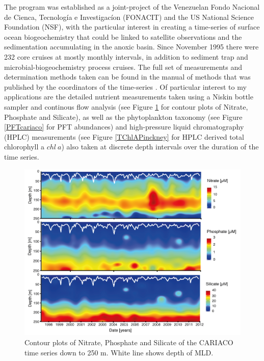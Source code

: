 The program was established as a joint-project of the Venezuelan Fondo Nacional de Cienca, Tecnolog\'{i}a e Investigac\'{i}on (FONACIT) and the US National Science Foundation (NSF), with the particular interest in creating a time-series of surface ocean biogeochemistry that could be linked to satellite observations and the sedimentation accumulating in the anoxic basin. 
Since  November 1995 there were 232 core cruises at mostly monthly intervals, in addition to sediment trap and microbial-biogeochemistry process cruises. The full set of measurements and determination methods taken can be found in the manual of methods that was published by the coordinators of the time-series \citep{Astor2013}. 
Of particular interest to my applications are the detailed nutrient measurements 
taken using a Niskin bottle sampler and continous flow analysis (see Figure \ref{CARIACOnuts} for contour plots of Nitrate, Phosphate and Silicate), as well as the phytoplankton taxonomy (see Figure \ref{PFTcariaco} for PFT abundances) and high-pressure liquid chromatography (HPLC) measurements (see Figure \ref{TChlAPinckney} for HPLC derived total chlorophyll a $chl~a$) also taken at discrete depth intervals over the duration of the time series. 

\begin{figure}
\centering
\includegraphics[trim = 0mm 0mm 0mm 0mm, clip, width=1.\linewidth]{./Chp1-Intro/NUTSatCARIACOAsset811.png}
\caption[Scheme]{\small {Contour plots of Nitrate, Phosphate and Silicate of the CARIACO time series down to 250 m. White line shows depth of MLD.}} 
\label{CARIACOnuts}
\end{figure}

